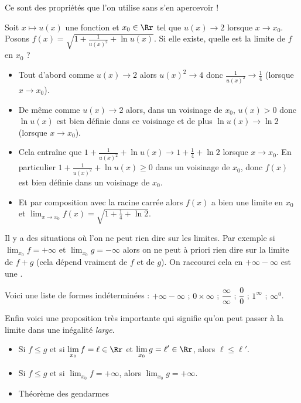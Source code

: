 \documentclass[class=report,crop=false]{standalone}
\begin{document}
Ce sont des propriétés que l'on utilise sans s'en apercevoir !
\begin{exemple}
Soit $x \mapsto u(x)$ une fonction et $x_0 \in \Rr$  tel que $u(x) \to 2$  lorsque $x \to x_0$.
Posons $f(x) = \sqrt{1+\frac{1}{u(x)^2}+\ln u(x)}$. Si elle existe, quelle est la limite de $f$ en $x_0$ ?

\begin{itemize}
  \item Tout d'abord comme $u(x) \to 2$ alors $u(x)^2 \to 4$ donc $
  \frac{1}{u(x)^2} \to \frac14$ (lorsque $x\to x_0$).

  \item De même comme $u(x) \to 2$ alors, dans un voisinage de $x_0$, $u(x)>0$ donc $\ln u(x)$ est bien définie dans ce voisinage
  et de plus $\ln u(x) \to \ln 2$ (lorsque $x \to x_0$).

  \item Cela entraîne que  $1+\frac{1}{u(x)^2}+\ln u(x) \to 1+\frac 14 + \ln 2$ lorsque $x \to x_0$.
  En particulier $1+\frac{1}{u(x)^2}+\ln u(x)\ge 0$ dans un voisinage de $x_0$, donc $f(x)$ est bien
  définie dans un voisinage de $x_0$.

  \item Et par composition avec la racine carrée alors $f(x)$ a bien une limite en $x_0$ et
  $\lim_{x\to x_0} f(x) = \sqrt{1+\frac14 + \ln 2}$.
\end{itemize}
\end{exemple}

\bigskip

Il y a des situations où l'on ne peut rien dire sur les limites.
Par exemple si $\lim_{x_0} f = +\infty$ et $\lim_{x_0} g = -\infty$ alors on ne peut à priori rien dire
sur la limite de $f+g$ (cela dépend vraiment de $f$ et de $g$).
On raccourci cela en $+\infty-\infty$ est une .

Voici une liste de formes indéterminées : $+\infty-\infty$ ; $0\times \infty$ ;
$\dfrac\infty\infty$ ; $\dfrac00$ ; $1^\infty$ ; $\infty^0$.

\bigskip

Enfin voici une proposition très importante qui 
signifie qu'on peut passer à la limite dans une inégalité \emph{large}.


\begin{proposition}
\sauteligne
\begin{itemize}
  \item Si $f\leq g$ et si $\displaystyle\lim_{x_0} f=\ell\in\Rr$ et $\displaystyle\lim_{x_0} g=\ell'\in\Rr$, alors $\ell\leq \ell'$.
  \item Si $f\leq g$ et si $\displaystyle\lim_{x_0} f=+\infty$, alors  $\displaystyle\lim_{x_0} g=+\infty$.
  \item Théorème des gendarmes
\end{itemize}
\end{proposition}
\end{document}
